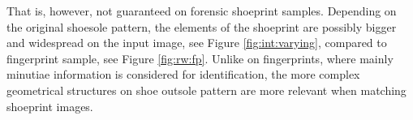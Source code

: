\documentclass[draft,final]{vutinfth} %
\begin{document}
That is, however, not guaranteed on forensic shoeprint samples.
Depending on the original shoesole pattern, the elements of the shoeprint are possibly bigger and widespread on the input image, see Figure  \ref{fig:int:varying}, compared to  fingerprint sample, see Figure \ref{fig:rw:fp}.
Unlike on fingerprints, where mainly minutiae information is considered for identification, the more complex geometrical structures on shoe outsole pattern are more relevant when matching shoeprint images.


\end{document}
